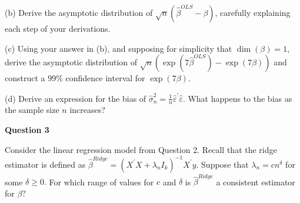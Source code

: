 \documentclass{article}
\begin{document}
(b) Derive the asymptotic distribution of $\sqrt{n}\left( \hat{\beta}%
^{OLS}-\beta \right) $, carefully explaining each step of your derivations.

(c) Using your answer in (b), and supposing for simplicity that $\dim \left(
\beta \right) =1,$ derive the asymptotic distribution of $\sqrt{n}\left(
\exp \left( 7\hat{\beta}^{OLS}\right) -\exp \left( 7\beta \right) \right) $
and construct a 99\% confidence interval for $\exp \left( 7\beta \right) .$

(d) Derive an expression for the bias of $\hat{\sigma}_{n}^{2}=\frac{1}{n}%
\hat{\varepsilon}^{\prime }\hat{\varepsilon}$. What happens to the bias as
the sample size $n$ increases?

\bigskip

\textbf{Question 3 }

Consider the linear regression model from Question 2. Recall that the ridge
estimator is defined as $\hat{\beta}^{Ridge}=\left( X^{\prime }X+\lambda
_{n}I_{k}\right) ^{-1}X^{\prime }y.$ Suppose that $\lambda _{n}=cn^{\delta }$
for some $\delta \geq 0.$ For which range of values for $c$ and $\delta $ is 
$\hat{\beta}^{Ridge}$ a consistent estimator for $\beta ?$
\end{document}
